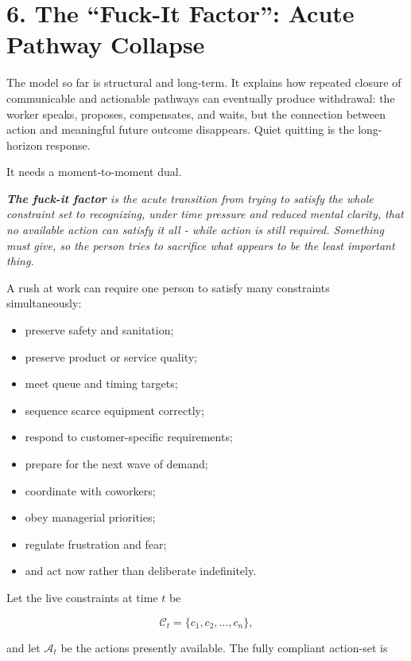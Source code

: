 \documentclass[11pt,oneside]{article}
\providecommand{\tightlist}{%
  \setlength{\itemsep}{0.22em}\setlength{\parskip}{0pt}}
\renewenvironment{quote}
  {\begin{tcolorbox}[
      enhanced,
      breakable,
      colback=ManifestLight,
      colframe=ManifestRule,
      boxrule=0pt,
      leftrule=3pt,
      arc=0pt,
      outer arc=0pt,
      left=10pt,right=10pt,top=8pt,bottom=8pt,
      before skip=0.8em,after skip=0.8em
    ]\itshape}
  {\end{tcolorbox}}
\begin{document}
\section{6. The ``Fuck-It Factor'': Acute Pathway
Collapse}\label{the-fuck-it-factor-acute-pathway-collapse}

The model so far is structural and long-term. It explains how repeated
closure of communicable and actionable pathways can eventually produce
withdrawal: the worker speaks, proposes, compensates, and waits, but the
connection between action and meaningful future outcome disappears.
Quiet quitting is the long-horizon response.

It needs a moment-to-moment dual.

\begin{quote}
\textbf{The fuck-it factor} is the acute transition from trying to
satisfy the whole constraint set to recognizing, under time pressure and
reduced mental clarity, that no available action can satisfy it all -
while action is still required. Something must give, so the person tries
to sacrifice what appears to be the least important thing.
\end{quote}

A rush at work can require one person to satisfy many constraints
simultaneously:

\begin{itemize}
\tightlist
\item
  preserve safety and sanitation;
\item
  preserve product or service quality;
\item
  meet queue and timing targets;
\item
  sequence scarce equipment correctly;
\item
  respond to customer-specific requirements;
\item
  prepare for the next wave of demand;
\item
  coordinate with coworkers;
\item
  obey managerial priorities;
\item
  regulate frustration and fear;
\item
  and act now rather than deliberate indefinitely.
\end{itemize}

Let the live constraints at time \(t\) be

\[
\mathcal C_t = \{c_1,c_2,\ldots,c_n\},
\]

and let \(\mathcal A_t\) be the actions presently available. The fully
compliant action-set is
\end{document}
